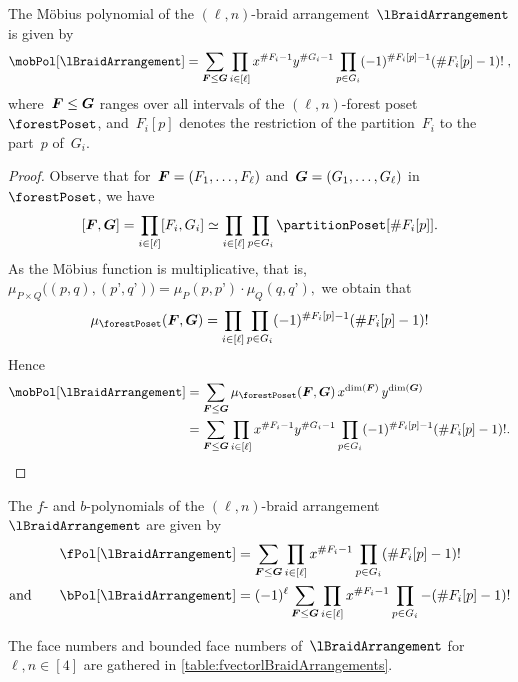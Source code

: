 \begin{theorem}
\label{thm:MobiusPolynomial}
The M\"obius polynomial of the $(\ell,n)$-braid arrangement~$\lBraidArrangement$ is given by
\[
\mobPol[\lBraidArrangement] = \sum_{\b{F} \le \b{G}} \prod_{i \in [\ell]} x^{\#F_i-1} y^{\#G_i-1} \prod_{p \in G_i} (-1)^{\#F_i[p]-1} (\# F_i[p]-1)! \; ,
\]
where~$\boldsymbol{F} \le \boldsymbol{G}$ ranges over all intervals of the $(\ell,n)$-forest poset~$\forestPoset$, and~$F_i[p]$ denotes the restriction of the partition~$F_i$ to the part~$p$ of~$G_i$.
\end{theorem}

\begin{proof}
Observe that for~$\boldsymbol{F} = (F_1, \dots, F_\ell)$ and~$\boldsymbol{G} = (G_1, \dots, G_\ell)$ in~$\forestPoset$, we have
\[
[\b{F}, \b{G}] = \prod_{i \in [\ell]} [F_i, G_i] \simeq \prod_{i \in [\ell]} \prod_{p \in G_i} \partitionPoset[{\#F_i[p]}].
\]
As the M\"obius function is multiplicative, that is,
\(
\mu_{P \times Q} \big( (p,q), (p’,q’) \big) = \mu_P(p,p’) \cdot \mu_Q(q,q’),
\)
we obtain that
\[
\mu_{\forestPoset}(\b{F}, \b{G}) = \prod_{i \in [\ell]} \prod_{p \in G_i} (-1)^{\#F_i[p]-1} (\# F_i[p]-1)!
\]
Hence
\begin{align*}
\mobPol[\lBraidArrangement] 
& = \sum_{\b{F} \le \b{G}} \mu_{\forestPoset}(\b{F}, \b{G}) \, x^{\dim(\b{F})} \, y^{\dim(\b{G})} \\
& = \sum_{\b{F} \le \b{G}} \prod_{i \in [\ell]} x^{\#F_i-1} y^{\#G_i-1} \prod_{p \in G_i} (-1)^{\#F_i[p]-1} (\# F_i[p]-1)!.
\qedhere
\end{align*}
\end{proof}

\begin{corollary}
The $f$- and $b$-polynomials of the $(\ell,n)$-braid arrangement~$\lBraidArrangement$ are given by
\begin{align*}
\fPol[\lBraidArrangement] & = \sum_{\b{F} \le \b{G}} \prod_{i \in [\ell]} x^{\#F_i-1} \prod_{p \in G_i} (\# F_i[p]-1)!\\
\text{and}\qquad
\bPol[\lBraidArrangement] & = (-1)^\ell \sum_{\b{F} \le \b{G}} \prod_{i \in [\ell]} x^{\#F_i-1} \prod_{p \in G_i} -(\# F_i[p]-1)!
\end{align*}
\end{corollary}

The face numbers and bounded face numbers of~$\lBraidArrangement$ for~$\ell, n \in [4]$ are gathered in \cref{table:fvectorlBraidArrangements}.

